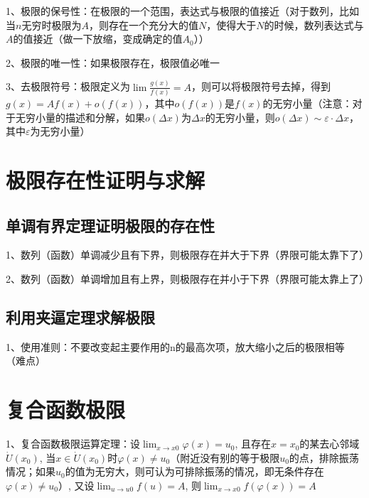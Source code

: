 1、极限的保号性：在极限的一个范围，表达式与极限的值接近（对于数列，比如当$n$无穷时极限为$A$，则存在一个充分大的值$N$，使得大于$N$的时候，数列表达式与$A$的值接近（做一下放缩，变成确定的值$A_0$））

2、极限的唯一性：如果极限存在，极限值必唯一

3、去极限符号：极限定义为$\lim \frac{g(x)}{f(x)}=A$，则可以将极限符号去掉，得到$g(x) = Af(x)+o(f(x))$，其中$o(f(x))$是$f(x)$的无穷小量（注意：对于无穷小量的描述和分解，如果$o(\Delta x)$为$\Delta x$的无穷小量，则$o(\Delta x) \sim \varepsilon·\Delta x$，其中$\varepsilon$为无穷小量）

\section{极限存在性证明与求解}



\subsection{单调有界定理证明极限的存在性}

1、数列（函数）单调减少且有下界，则极限存在并大于下界（界限可能太靠下了）

2、数列（函数）单调增加且有上界，则极限存在并小于下界（界限可能太靠上了）



\subsection{利用夹逼定理求解极限}

1、使用准则：不要改变起主要作用的n的最高次项，放大缩小之后的极限相等（难点）

\section{复合函数极限}

1、复合函数极限运算定理：设$\lim_{x \rightarrow x{0}} \varphi(x)=u_{0}$, 且存在$x=x_{0}$的某去心邻域$\dot{U}\left(x_{0}\right)$, 当$x \in \dot{U}\left(x_{0}\right)$时$\varphi(x) \neq u_{0}$（附近没有别的等于极限$u_{0}$的点，排除振荡情况；如果$u_{0}$的值为无穷大，则可认为可排除振荡的情况，即无条件存在$\varphi(x) \neq u_{0}$）, 又设$\lim_{u \rightarrow u{0}} f(u)=A$, 则$\lim_{x \rightarrow x{0}} f(\varphi(x))=A$

